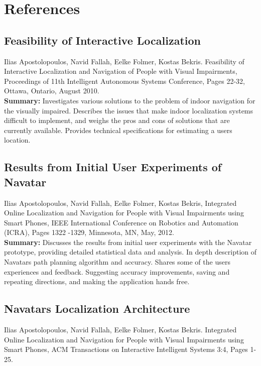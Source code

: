 \documentclass{scrreprt}
\begin{document}
\chapter{References}

\section{Feasibility of Interactive Localization}
Ilias Apostolopoulos, Navid Fallah, Eelke Folmer, Kostas Bekris. Feasibility of Interactive Localization and Navigation of People with Visual Impairments, Proceedings of 11th Intelligent Autonomous Systems Conference, Pages 22-32, Ottawa, Ontario, August 2010.\\
 
 \textbf{Summary:}
 Investigates various solutions to the problem of indoor navigation for the visually impaired. Describes the issues that make indoor localization systems difficult to implement, and weighs the pros and cons of solutions that are currently available. Provides technical specifications for estimating a user\textsc{}s location.
 
\section{Results from Initial User Experiments of Navatar}
Ilias Apostolopoulos, Navid Fallah, Eelke Folmer, Kostas Bekris, Integrated Online Localization and Navigation for People with Visual Impairments using Smart Phones, IEEE International Conference on Robotics and Automation (ICRA), Pages 1322 -1329, Minnesota, MN, May, 2012.\\

\textbf{Summary:}
Discusses the results from initial user experiments with the Navatar prototype, providing detailed statistical data and analysis. In depth description of Navatar\textsc{}s path planning algorithm and accuracy. Shares some of the user\textsc{}s experiences and feedback. Suggesting accuracy improvements, saving and repeating directions, and making the application hands free.

\section{Navatar\textsc{}s Localization Architecture}
 Ilias Apostolopoulos, Navid Fallah, Eelke Folmer, Kostas Bekris. Integrated Online Localization and Navigation for People with Visual Impairments using Smart Phones, ACM Transactions on Interactive Intelligent Systems 3:4, Pages 1-25.\\
\end{document}
